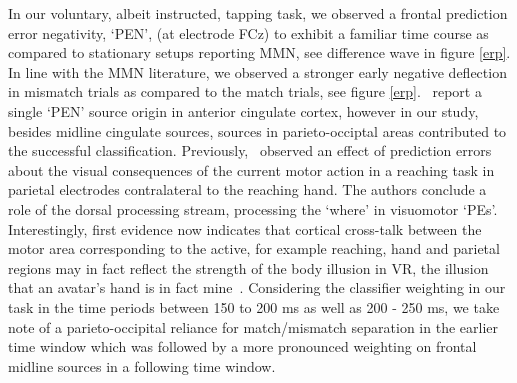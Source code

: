 In our voluntary, albeit instructed, tapping task, we observed a frontal prediction error negativity, `PEN', (at electrode FCz) to exhibit a familiar time course as compared to stationary setups reporting MMN, see difference wave in figure \ref{erp}. In line with the MMN literature, we observed a stronger early negative deflection in mismatch trials as compared to the match trials, see figure \ref{erp}.~\cite{Zander2016-ed} report a single `PEN' source origin in anterior cingulate cortex, however in our study, besides midline cingulate sources, sources in parieto-occiptal areas contributed to the successful classification. Previously,~\cite{Savoie2018-ad} observed an effect of prediction errors about the visual consequences of the current motor action in a reaching task in parietal electrodes contralateral to the reaching hand. The authors conclude a role of the dorsal processing stream, processing the `where' in visuomotor `PEs'. Interestingly, first evidence now indicates that cortical cross-talk between the motor area corresponding to the active, for example reaching, hand and parietal regions may in fact reflect the strength of the body illusion in VR, the illusion that an avatar's hand is in fact mine~\cite{Casula2022-tq}. Considering the classifier weighting in our task in the time periods between 150 to 200 ms as well as 200 - 250 ms, we take note of a parieto-occipital reliance for match/mismatch separation in the earlier time window which was followed by a more pronounced weighting on frontal midline sources in a following time window.

